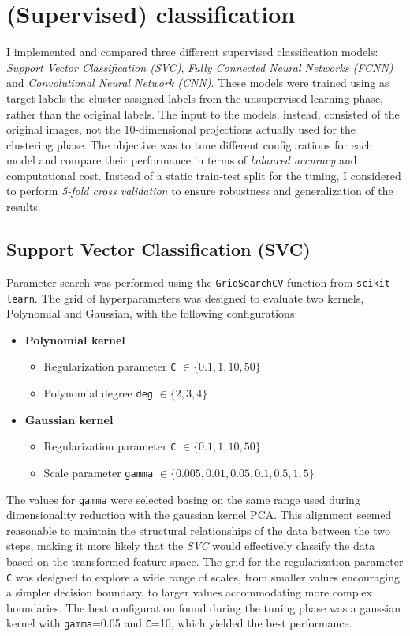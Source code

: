 \section{(Supervised) classification}\label{hybrid_model_tuning}
I implemented and compared three different supervised classification models: \emph{Support Vector Classification (SVC)},
\emph{Fully Connected Neural Networks (FCNN)} and \emph{Convolutional Neural Network (CNN)}. These models were trained using as target labels the 
cluster-assigned labels from the unsupervised learning phase, rather than the original labels. The input to the models, 
instead, consisted of the original images, not the 10-dimensional projections actually used for the clustering phase. The objective was to tune different 
configurations for each model and compare their performance in terms of \emph{balanced accuracy} and computational cost. Instead of a static
train-test split for the tuning, I considered to perform \emph{5-fold cross validation} to ensure robustness and generalization of the results.

\subsection{Support Vector Classification (SVC)}\label{hybrid_model:svc}
Parameter search was performed using the \texttt{GridSearchCV} function from \texttt{scikit-learn}. The grid of hyperparameters was designed 
to evaluate two kernels, Polynomial and Gaussian, with the following configurations:
\begin{itemize}
    \item \textbf{Polynomial kernel}
    \begin{itemize}
        \item Regularization parameter \texttt{C} $\in \{0.1, 1, 10, 50\}$
        \item Polynomial degree \texttt{deg} $\in \{2, 3, 4\}$
    \end{itemize}
    \item \textbf{Gaussian kernel}
    \begin{itemize}
        \item Regularization parameter \texttt{C} $\in \{0.1, 1, 10, 50\}$
        \item Scale parameter \texttt{gamma} $\in \{0.005,0.01,0.05,0.1,0.5,1,5\}$
    \end{itemize}
\end{itemize}

The values for \texttt{gamma} were selected basing on the same range used during dimensionality reduction with the gaussian kernel PCA. 
This alignment seemed reasonable to maintain the structural relationships of the data between the two steps, making it more likely that 
the \emph{SVC} would effectively classify the data based on the transformed feature space. The grid for the regularization parameter \texttt{C} 
was designed to explore a wide range of scales, from smaller values encouraging a simpler decision boundary, to larger values accommodating 
more complex boundaries. The best configuration found during the tuning phase was a gaussian kernel with \texttt{gamma}=0.05 and 
\texttt{C}=10, which yielded the best performance.
\newpage

